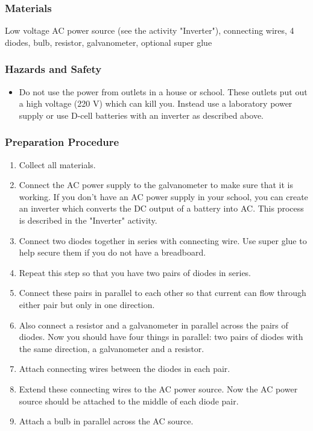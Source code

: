 \subsubsection*{Materials}
Low voltage AC power source (see the activity "Inverter"), connecting wires, 4 diodes, bulb, resistor, galvanometer, optional super glue

\subsubsection*{Hazards and Safety}
\begin{itemize}
\item{Do not use the power from outlets in a house or school.  These outlets put out a high voltage (220 V) which can kill you.  Instead use a laboratory power supply or use D-cell batteries with an inverter as described above.}
\end{itemize}

\subsubsection*{Preparation Procedure}
\begin{enumerate}
\item{Collect all materials.}
\item{Connect the AC power supply to the galvanometer to make sure that it is working.  If you don't have an AC power supply in your school, you can create an inverter which converts the DC output of a battery into AC.  This process is described in the "Inverter" activity.}
\item{Connect two diodes together in series with connecting wire.  Use super glue to help secure them if you do not have a breadboard.}
\item{Repeat this step so that you have two pairs of diodes in series.}
\item{Connect these pairs in parallel to each other so that current can flow through either pair but only in one direction.}
\item{Also connect a resistor and a galvanometer in parallel across the pairs of diodes.  Now you should have four things in parallel: two pairs of diodes with the same direction, a galvanometer and a resistor.}
\item{Attach connecting wires between the diodes in each pair.}
\item{Extend these connecting wires to the AC power source.  Now the AC power source should be attached to the middle of each diode pair.}
\item{Attach a bulb in parallel across the AC source.}
\end{enumerate}

